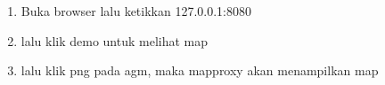 \begin{enumerate}
  \item Buka browser lalu ketikkan 127.0.0.1:8080


  \item lalu klik demo untuk melihat map
  \item lalu klik png pada agm, maka mapproxy akan menampilkan map


\end{enumerate}




